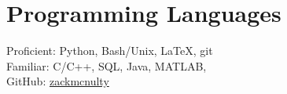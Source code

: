 \section{\sc Programming Languages}
Proficient:  Python,  Bash/Unix, \LaTeX, git\\
Familiar: C/C++, SQL, Java, MATLAB,\\
GitHub: \href{https://github.com/zackmcnulty}{zackmcnulty}

\endinput